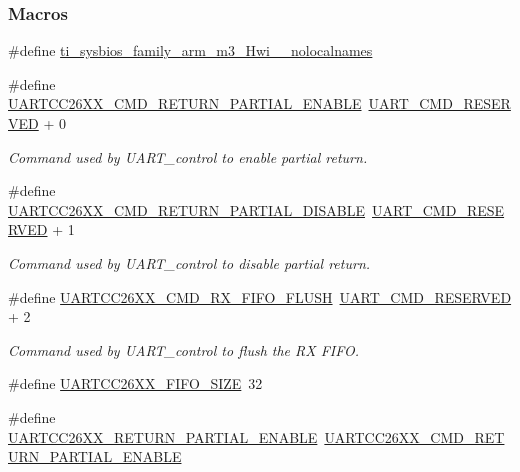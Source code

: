 \subsubsection*{Macros}
\begin{DoxyCompactItemize}
\item 
\#define \hyperlink{_u_a_r_t_c_c26_x_x_8h_aaa17ecf48f5762e2e1bdb0bab8aacf0c}{ti\+\_\+sysbios\+\_\+family\+\_\+arm\+\_\+m3\+\_\+\+Hwi\+\_\+\+\_\+nolocalnames}
\item 
\#define \hyperlink{group___u_a_r_t___c_m_d_ga90f59d674fd3b290c3dd711128413014}{U\+A\+R\+T\+C\+C26\+X\+X\+\_\+\+C\+M\+D\+\_\+\+R\+E\+T\+U\+R\+N\+\_\+\+P\+A\+R\+T\+I\+A\+L\+\_\+\+E\+N\+A\+B\+L\+E}~\hyperlink{group___u_a_r_t___c_o_n_t_r_o_l_ga0f5a809e0884da33fef102236eb51644}{U\+A\+R\+T\+\_\+\+C\+M\+D\+\_\+\+R\+E\+S\+E\+R\+V\+E\+D} + 0
\begin{DoxyCompactList}\small\item\em Command used by U\+A\+R\+T\+\_\+control to enable partial return. \end{DoxyCompactList}\item 
\#define \hyperlink{group___u_a_r_t___c_m_d_ga7cc7c1551022a60bd310c79acb6b26b8}{U\+A\+R\+T\+C\+C26\+X\+X\+\_\+\+C\+M\+D\+\_\+\+R\+E\+T\+U\+R\+N\+\_\+\+P\+A\+R\+T\+I\+A\+L\+\_\+\+D\+I\+S\+A\+B\+L\+E}~\hyperlink{group___u_a_r_t___c_o_n_t_r_o_l_ga0f5a809e0884da33fef102236eb51644}{U\+A\+R\+T\+\_\+\+C\+M\+D\+\_\+\+R\+E\+S\+E\+R\+V\+E\+D} + 1
\begin{DoxyCompactList}\small\item\em Command used by U\+A\+R\+T\+\_\+control to disable partial return. \end{DoxyCompactList}\item 
\#define \hyperlink{group___u_a_r_t___c_m_d_ga56280a288223c44c73a5169e957dc078}{U\+A\+R\+T\+C\+C26\+X\+X\+\_\+\+C\+M\+D\+\_\+\+R\+X\+\_\+\+F\+I\+F\+O\+\_\+\+F\+L\+U\+S\+H}~\hyperlink{group___u_a_r_t___c_o_n_t_r_o_l_ga0f5a809e0884da33fef102236eb51644}{U\+A\+R\+T\+\_\+\+C\+M\+D\+\_\+\+R\+E\+S\+E\+R\+V\+E\+D} + 2
\begin{DoxyCompactList}\small\item\em Command used by U\+A\+R\+T\+\_\+control to flush the R\+X F\+I\+F\+O. \end{DoxyCompactList}\item 
\#define \hyperlink{_u_a_r_t_c_c26_x_x_8h_aa3cbdad922e595319c76870add0d41e6}{U\+A\+R\+T\+C\+C26\+X\+X\+\_\+\+F\+I\+F\+O\+\_\+\+S\+I\+Z\+E}~32
\item 
\#define \hyperlink{_u_a_r_t_c_c26_x_x_8h_a681da30c89054d687603b864792894f7}{U\+A\+R\+T\+C\+C26\+X\+X\+\_\+\+R\+E\+T\+U\+R\+N\+\_\+\+P\+A\+R\+T\+I\+A\+L\+\_\+\+E\+N\+A\+B\+L\+E}~\hyperlink{group___u_a_r_t___c_m_d_ga90f59d674fd3b290c3dd711128413014}{U\+A\+R\+T\+C\+C26\+X\+X\+\_\+\+C\+M\+D\+\_\+\+R\+E\+T\+U\+R\+N\+\_\+\+P\+A\+R\+T\+I\+A\+L\+\_\+\+E\+N\+A\+B\+L\+E}

\end{DoxyCompactItemize}
